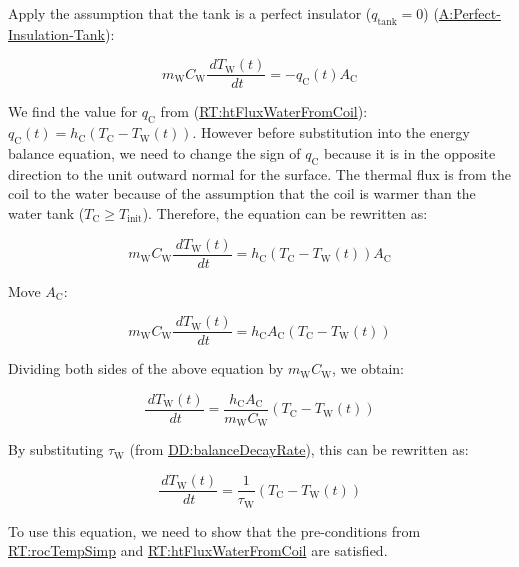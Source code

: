 \documentclass[12pt]{article}
\begin{document}
Apply the assumption that the tank is a perfect insulator ($q_\text{tank}=0$)
(\hyperref[assumpPIT]{A:Perfect-Insulation-Tank}): 

\begin{displaymath}
m_\text{W} C_\text{W} \frac{\,dT_\text{W}(t)}{\,dt} = -{q_\text{C}(t)} {A_\text{C}}
\end{displaymath}
        
We find the value for ${q_{\text{C}}}$ from
(\hyperref[RT:htFluxWaterFromCoil]{RT:htFluxWaterFromCoil}):
${q_{\text{C}}(t)}={h_{\text{C}}}
\left({T_{\text{C}}}-{T_{\text{W}}}\left(t\right)\right)$.  However before
substitution into the energy balance equation, we need to change the sign of
${q_{\text{C}}}$ because it is in the opposite direction to the unit outward
normal for the surface.  The thermal flux is from the coil to the water because
of the assumption that the coil is warmer than the water tank ($T_\text{C} \geq
T_\text{init}$).  Therefore, the equation can be rewritten as:

\begin{displaymath}
m_\text{W} C_\text{W} \frac{\,dT_\text{W}(t)}{\,dt} = {h_{\text{C}}}
\left({T_{\text{C}}}-{T_{\text{W}}}\left(t\right)\right) {A_\text{C}}
\end{displaymath}
        
Move $A_\text{C}$:

\begin{displaymath}
m_\text{W} C_\text{W} \frac{\,dT_\text{W}(t)}{\,dt} = {h_{\text{C}}} {A_\text{C}}
\left({T_{\text{C}}}-{T_{\text{W}}}\left(t\right)\right) 
\end{displaymath}
        
Dividing both sides of the above equation by ${m_{\text{W}}} {C_{\text{W}}}$, we
obtain:

\begin{displaymath}
\frac{\,d{T_{\text{W}}}(t)}{\,dt}=\frac{{h_{\text{C}}} {A_{\text{C}}}}{{m_{\text{W}}} {C_{\text{W}}}} \left({T_{\text{C}}}-{T_{\text{W}}(t)}\right)
\end{displaymath}

By substituting ${τ_{\text{W}}}$ (from \hyperref[DD:balanceDecayRate]{DD:balanceDecayRate}), this can be rewritten as:

\begin{displaymath}
\frac{\,d{T_{\text{W}}}(t)}{\,dt}=\frac{1}{{τ_{\text{W}}}} \left({T_{\text{C}}}-{T_{\text{W}}(t)}\right)
\end{displaymath}

To use this equation, we need to show that the pre-conditions from
\hyperref[RT:rocTempSimp]{RT:rocTempSimp} and
\hyperref[RT:htFluxWaterFromCoil]{RT:htFluxWaterFromCoil} are satisfied.
\end{document}
